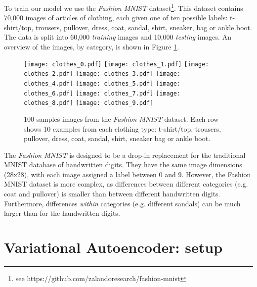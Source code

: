 \documentclass[]{article}
\begin{document}
To train our model we use the \textit{Fashion MNIST} dataset\footnote{see https://github.com/zalandoresearch/fashion-mnist}. This dataset contains 70,000 images of articles of clothing, each given one of ten possible labels: t-shirt/top, trousers, pullover, dress, coat, sandal, shirt, sneaker, bag or ankle boot. The data is split into 60,000 \textit{training} images and 10,000 \textit{testing} images. An overview of the images, by category, is shown in Figure \ref{fig:mnist_fashion}.

\begin{figure}
  \centering
  \texttt{[image: clothes\_0.pdf]}
  \texttt{[image: clothes\_1.pdf]}
  \texttt{[image: clothes\_2.pdf]}
  \texttt{[image: clothes\_3.pdf]}
  \texttt{[image: clothes\_4.pdf]}
  \texttt{[image: clothes\_5.pdf]}
  \texttt{[image: clothes\_6.pdf]}
  \texttt{[image: clothes\_7.pdf]}
  \texttt{[image: clothes\_8.pdf]}
  \texttt{[image: clothes\_9.pdf]}
  \caption{100 samples images from the \textit{Fashion MNIST} dataset. Each row shows 10 examples from each clothing type: t-shirt/top, trousers, pullover, dress, coat, sandal, shirt, sneaker bag or ankle boot.}
  \label{fig:mnist_fashion}
\end{figure}

The \textit{Fashion MNIST} is designed to be a drop-in replacement for the traditional MNIST database of handwritten digits. They have the same image dimensions (28x28), with each image assigned a label between 0 and 9. However, the Fashion MNIST dataset is more complex, as differences between different categories (e.g. coat and pullover) is smaller than between different handwritten digits. Furthermore, differences \textit{within} categories (e.g. different sandals) can be much larger than for the handwritten digits.




\section{Variational Autoencoder: setup}
\label{sec:vae}
\end{document}
